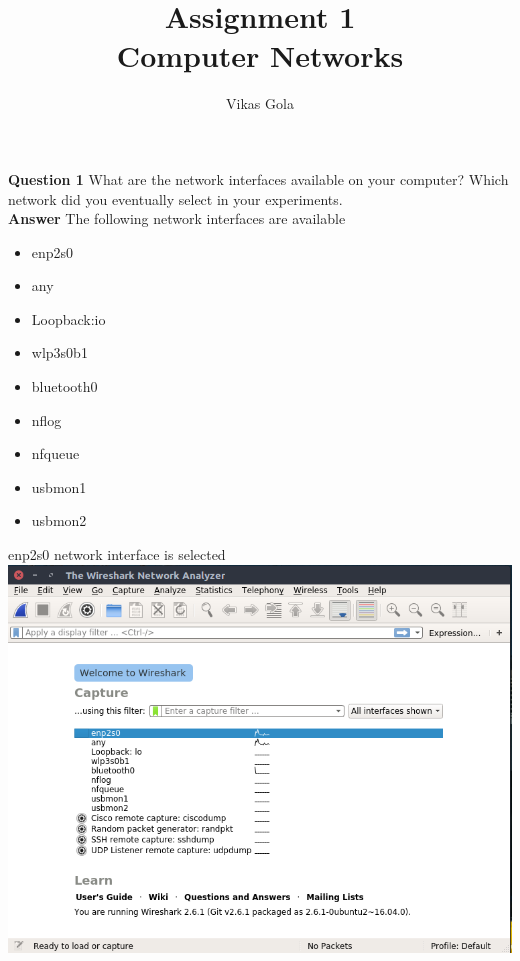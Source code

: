 \documentclass[14pt]{extarticle}
\begin{document}
    \pagestyle{plain}

    \title{\Huge Assignment 1\\ Computer Networks}
    \author{\huge Vikas Gola}
    \maketitle
    \newpage

    \noindent
    \textbf{\large Question 1}
    What are the network interfaces available on your computer? Which network did you
    eventually select in your experiments.\\[10pt]
    \textbf{\large Answer}
    The following network interfaces are available
    \begin{itemize}
        \item enp2s0
        \item any
        \item Loopback:io
        \item wlp3s0b1
        \item bluetooth0
        \item nflog
        \item nfqueue
        \item usbmon1
        \item usbmon2
    \end{itemize}
    enp2s0 network interface is selected\\[8pt]
    \includegraphics[scale=0.55]{1}
    \vspace{1cm}
    
\end{document}
